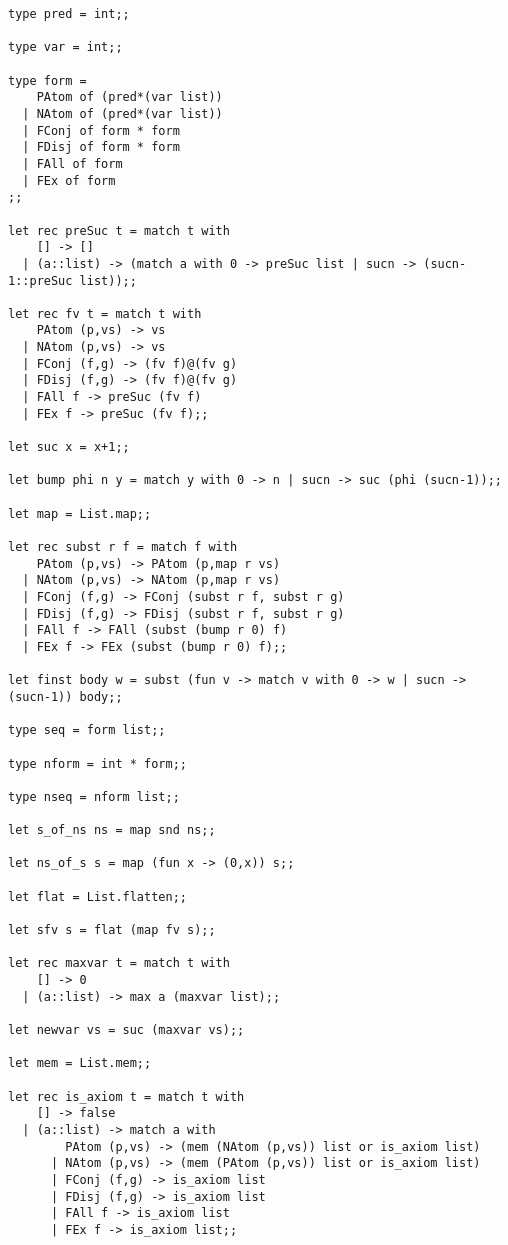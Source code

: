 \documentclass[11pt,a4paper]{article}
\begin{document}
\begin{verbatim}
type pred = int;;

type var = int;;

type form = 
    PAtom of (pred*(var list))
  | NAtom of (pred*(var list))
  | FConj of form * form
  | FDisj of form * form
  | FAll of form
  | FEx of form
;;

let rec preSuc t = match t with
    [] -> []
  | (a::list) -> (match a with 0 -> preSuc list | sucn -> (sucn-1::preSuc list));;

let rec fv t = match t with
    PAtom (p,vs) -> vs
  | NAtom (p,vs) -> vs
  | FConj (f,g) -> (fv f)@(fv g)
  | FDisj (f,g) -> (fv f)@(fv g)
  | FAll f -> preSuc (fv f)
  | FEx f -> preSuc (fv f);;

let suc x = x+1;;

let bump phi n y = match y with 0 -> n | sucn -> suc (phi (sucn-1));;

let map = List.map;;

let rec subst r f = match f with
    PAtom (p,vs) -> PAtom (p,map r vs)
  | NAtom (p,vs) -> NAtom (p,map r vs)
  | FConj (f,g) -> FConj (subst r f, subst r g)
  | FDisj (f,g) -> FDisj (subst r f, subst r g)
  | FAll f -> FAll (subst (bump r 0) f)
  | FEx f -> FEx (subst (bump r 0) f);;

let finst body w = subst (fun v -> match v with 0 -> w | sucn -> (sucn-1)) body;;

type seq = form list;;

type nform = int * form;;

type nseq = nform list;;

let s_of_ns ns = map snd ns;;

let ns_of_s s = map (fun x -> (0,x)) s;;

let flat = List.flatten;;

let sfv s = flat (map fv s);;

let rec maxvar t = match t with
    [] -> 0
  | (a::list) -> max a (maxvar list);;

let newvar vs = suc (maxvar vs);;

let mem = List.mem;;

let rec is_axiom t = match t with
    [] -> false
  | (a::list) -> match a with
        PAtom (p,vs) -> (mem (NAtom (p,vs)) list or is_axiom list)
      | NAtom (p,vs) -> (mem (PAtom (p,vs)) list or is_axiom list)
      | FConj (f,g) -> is_axiom list 
      | FDisj (f,g) -> is_axiom list 
      | FAll f -> is_axiom list
      | FEx f -> is_axiom list;;



\end{verbatim}
\end{document}
